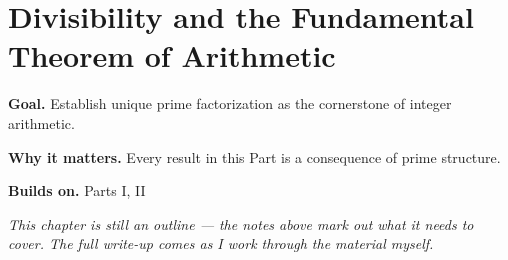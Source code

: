 \chapter{Divisibility and the Fundamental Theorem of Arithmetic}
\label{ch:05-number-theory-01}

\begin{chapterintro}
\textbf{Goal.} Establish unique prime factorization as the cornerstone of integer arithmetic.

\textbf{Why it matters.} Every result in this Part is a consequence of prime structure.

\textbf{Builds on.} Parts I, II
\end{chapterintro}

\textit{This chapter is still an outline --- the notes above mark out what it needs to cover. The full write-up comes as I work through the material myself.}
